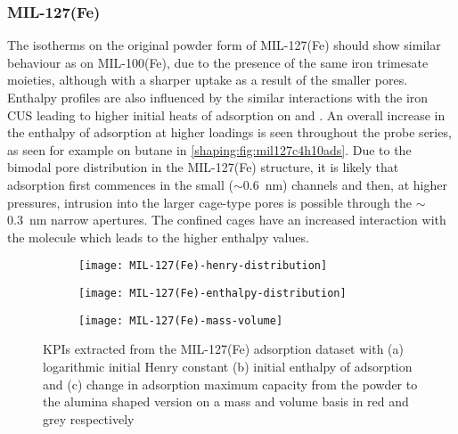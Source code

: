 
\subsubsection{MIL-127(Fe)}

The isotherms on the original powder form of MIL-127(Fe)
should show similar behaviour as on MIL-100(Fe),
due to the presence of the same iron trimesate moieties,
although with a sharper uptake as a result of the smaller pores. Enthalpy
profiles are also influenced by the similar interactions with the iron
CUS leading to higher initial heats of adsorption on  and .
An overall increase in the enthalpy of adsorption at higher loadings is seen
throughout the probe series, as seen for example on butane in
\autoref{shaping:fig:mil127c4h10ads}.
Due to the bimodal pore distribution in the MIL-127(Fe) structure,
it is likely that adsorption first commences in the small
(\( \sim \)\SI{0.6}{\nano\metre}) channels and then, at higher pressures,
intrusion into the larger cage-type pores is possible through the
\( \sim \)\SI{0.3}{\nano\metre} narrow apertures.
The confined cages have an increased interaction with the molecule
which leads to the higher enthalpy values.

\begin{figure}[p!]
	\centering
	\begin{subfigure}{\linewidth}
		\parbox[c]{0.1\linewidth}{\caption{}%
			\label{shaping:fig:analysismil127henry}}%
		\parbox[b]{0.8\linewidth}{%
			\texttt{[image: MIL-127(Fe)-henry-distribution]}%
		}%
	\end{subfigure}%

	\begin{subfigure}{\linewidth}
		\parbox[c]{0.1\linewidth}{\caption{}%
			\label{shaping:fig:analysismil127enth}}%
		\parbox[b]{0.8\linewidth}{%
			\texttt{[image: MIL-127(Fe)-enthalpy-distribution]}%
		}%
	\end{subfigure}%

	\begin{subfigure}{\linewidth}
		\parbox[c]{0.1\linewidth}{\caption{}%
			\label{shaping:fig:analysismil127basis}}%
		\parbox[b]{0.8\linewidth}{%
			\texttt{[image: MIL-127(Fe)-mass-volume]}%
		}%
	\end{subfigure}%

	\caption{KPIs extracted from the MIL-127(Fe) adsorption dataset with
		(a) logarithmic initial Henry constant (b) initial enthalpy of
        adsorption and (c) change in adsorption maximum capacity from 
        the powder to the alumina shaped version on a mass and volume 
        basis in red and grey respectively}%
	\label{shaping:fig:analysismil127}
\end{figure}

